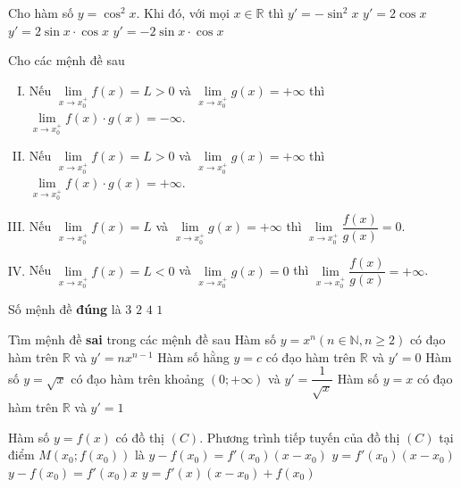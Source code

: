 \begin{ex}%
Cho hàm số $y=\cos^2 x$. Khi đó, với mọi $x\in \mathbb{R}$ thì
\choice
{$y'=-\sin^2 x$}
{$y'=2\cos x$}
{$y'=2\sin x \cdot\cos x$}
{\True $y'=-2\sin x \cdot \cos x$}
\end{ex}

\begin{ex}%
Cho các mệnh đề sau
\begin{enumerate}[I)]
	\item Nếu $\underset{x\to x_0^{+}}{\mathop{\lim}}f(x)=L>0$ và $\underset{x\to x_0^{+}}{\mathop{\lim}}g(x)=+\infty $ thì $\underset{x\to x_0^{+}}{\mathop{\lim}}f(x) \cdot g(x)=-\infty $.
	\item Nếu $\underset{x\to x_0^{+}}{\mathop{\lim}}f(x)=L>0$ và $\underset{x\to x_0^{+}}{\mathop{\lim}}g(x)=+\infty $ thì $\underset{x\to x_0^{+}}{\mathop{\lim}}f(x) \cdot g(x)=+\infty $.
	\item Nếu $\underset{x\to x_0^{+}}{\mathop{\lim}}f(x)=L$ và $\underset{x\to x_0^{+}}{\mathop{\lim}}g(x)=+\infty $ thì $\underset{x\to x_0^{+}}{\mathop{\lim}}\dfrac{f(x)}{g(x)}=0$.
	\item Nếu $\underset{x\to x_0^{+}}{\mathop{\lim}}f(x)=L<0$ và $\underset{x\to x_0^{+}}{\mathop{\lim}}g(x)=0$ thì $\underset{x\to x_0^{+}}{\mathop{\lim}}\dfrac{f(x)}{g(x)}=+\infty $.
\end{enumerate}
Số mệnh đề\textbf{ đúng} là
\choice
{$3$}
{\True $2$}
{$4$}
{$1$}
\end{ex}

\begin{ex}%
Tìm mệnh đề \textbf{sai} trong các mệnh đề sau
\choice
{Hàm số $y=x^n (n\in \mathbb{N},n\ge 2)$ có đạo hàm trên $\mathbb{R}$ và $y'=n{x}^{n-1}$}
{Hàm số hằng $y=c$ có đạo hàm trên $\mathbb{R}$ và $y'=0$}
{\True Hàm số $y=\sqrt{x}$ có đạo hàm trên khoảng $(0;+\infty)$ và $y'=\dfrac{1}{\sqrt{x}}$}
{Hàm số $y=x$ có đạo hàm trên $\mathbb{R}$ và $y'=1$}
\end{ex}

\begin{ex}%
	Hàm số $y=f(x)$ có đồ thị $(C)$. Phương trình tiếp tuyến của đồ thị $(C)$ tại điểm $M(x_0;f(x_0))$ là
	\choice
	{\True $y-f(x_0)=f'(x_0)(x-x_0)$}
	{$y=f'(x_0)(x-x_0)$}
	{$y-f(x_0)=f'(x_0)x$}
	{$y=f'(x)(x-x_0)+f(x_0)$}
\end{ex}

